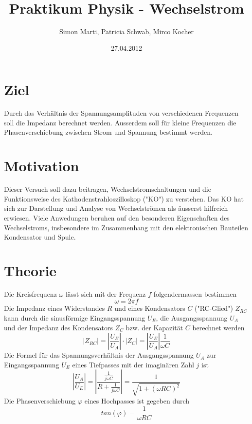 \documentclass[12pt,a4paper]{article}
\title{Praktikum Physik - Wechselstrom}
\author{Simon Marti, Patricia Schwab, Mirco Kocher}
\date{27.04.2012}
\begin{document}
\maketitle

\section*{Ziel}
Durch das Verh\"altnis der Spannungsamplituden von verschiedenen Frequenzen soll die Impedanz berechnet werden.
Ausserdem soll f\"ur kleine Frequenzen die Phasenverschiebung zwischen Strom und Spannung bestimmt werden.


\section*{Motivation}
Dieser Versuch soll dazu beitragen, Wechselstromschaltungen und die Funktionsweise des Kathodenstrahloszilloskop ("KO") zu verstehen.
Das KO hat sich zur Darstellung und Analyse von Wechselstr\"omen als \"ausserst hilfreich erwiesen.
Viele Anwedungen beruhen auf den besonderen Eigenschaften des Wechselstroms, insbesondere im Zusammenhang mit den elektronischen Bauteilen Kondensator und Spule.


\section*{Theorie}
Die Kreisfrequenz $\omega$ l\"asst sich mit der Frequenz $f$ folgendermassen bestimmen
\begin{equation}
\omega = 2\pi f
\end{equation}
Die Impedanz eines Widerstandes $R$ und eines Kondensators $C$ ("RC-Glied") $Z_{RC}$ kann durch die sinusf\"ormige Eingangsspannung $U_E$, die Ausgangsspannung $U_A$ und der Impedanz des Kondensators $Z_C$ bzw. der Kapazit\"at $C$ berechnet werden
\begin{equation}
|Z_{RC}| = \left| \frac{U_E}{U_A} \right| \cdot |Z_C| = \left| \frac{U_E}{U_A} \right| \frac{1}{\omega C}
\end{equation}
Die Formel f\"ur das Spannungsverh\"altnis der Ausgangsspannung $U_A$ zur Eingangsspannung $U_E$ eines Tiefpasses mit der imagin\"aren Zahl $j$ ist
\begin{equation}
\left| \frac{U_A}{U_E} \right|= \left| \frac{\frac{1}{j\omega C}}{R + \frac{1}{j\omega C}}\right| = \frac{1}{\sqrt{1+(\omega RC)^2}}
\end{equation}
Die Phasenverschiebung $\varphi$  eines Hochpasses ist gegeben durch
\begin{equation}
tan(\varphi) = \frac{1}{\omega R C}
\end{equation}
\end{document}
